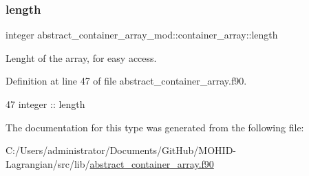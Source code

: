 \subsubsection{\texorpdfstring{length}{length}}
{\footnotesize\ttfamily integer abstract\+\_\+container\+\_\+array\+\_\+mod\+::container\+\_\+array\+::length\hspace{0.3cm}{\ttfamily [private]}}



Lenght of the array, for easy access. 



Definition at line 47 of file abstract\+\_\+container\+\_\+array.\+f90.


\begin{DoxyCode}
47         \textcolor{keywordtype}{integer} :: length
\end{DoxyCode}


The documentation for this type was generated from the following file\+:\begin{DoxyCompactItemize}
\item 
C\+:/\+Users/administrator/\+Documents/\+Git\+Hub/\+M\+O\+H\+I\+D-\/\+Lagrangian/src/lib/\mbox{\hyperlink{abstract__container__array_8f90}{abstract\+\_\+container\+\_\+array.\+f90}}\end{DoxyCompactItemize}
